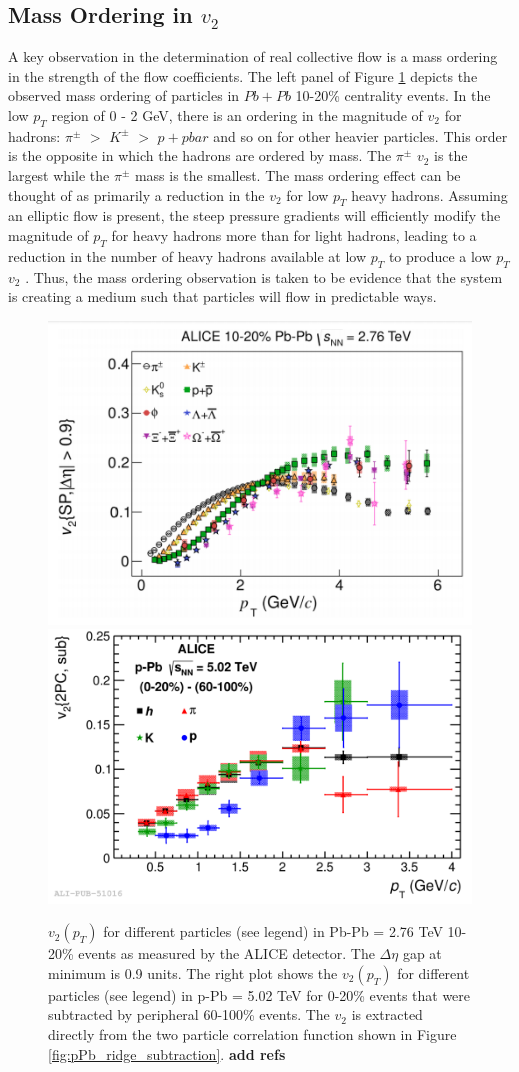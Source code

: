 \subsection{Mass Ordering in $v_2$}
A key observation in the determination of real collective flow is a mass ordering in the strength of the flow coefficients. The left panel of Figure \ref{fig:PbpPb_mass_ordering} depicts the observed mass ordering of particles in $Pb+Pb$ 10-20\% centrality events. In the low $p_T$ region of 0 - 2 GeV, there is an ordering in the magnitude of $v_2$ for hadrons: $\pi^{\pm}$ $>$ $K^{\pm}$ $>$ $p+pbar$ and so on for other heavier particles. This order is the opposite in which the hadrons are ordered by mass. The $\pi^{\pm}$ $v_2$ is the largest while the $\pi^{\pm}$ mass is the smallest. The mass ordering effect can be thought of as primarily a reduction in the $v_2$ for low $p_T$ heavy hadrons. Assuming an elliptic flow is present, the steep pressure gradients will efficiently modify the magnitude of $p_T$ for heavy hadrons more than for light hadrons, leading to a reduction in the number of heavy hadrons available at low $p_T$ to produce a low $p_T$ $v_2$ \cite{PhysRevC.77.044909}. Thus, the mass ordering observation is taken to be evidence that the system is creating a medium such that particles will flow in predictable ways.

\begin{figure}[h!]
\begin{center}
\includegraphics[width=0.48\linewidth]{figs/PbPb_v2_mass_ordering.PNG}
\includegraphics[width=0.48\linewidth]{figs/pPb_two_part_v2_mass_ordering.PNG}
\caption{$v_2(p_T)$ for different particles (see legend) in Pb-Pb \sqsn = 2.76 TeV 10-20\% events as measured by the ALICE detector. The $\Delta\eta$ gap at minimum is 0.9 units. The right plot shows the $v_2(p_T)$ for different particles (see legend) in p-Pb \sqsn = 5.02 TeV for 0-20\% events that were subtracted by peripheral 60-100\% events. The $v_2$ is extracted directly from the two particle correlation function shown in Figure \ref{fig:pPb_ridge_subtraction}. \textbf{add refs}}
\label{fig:PbpPb_mass_ordering}
\end{center}
\end{figure}


